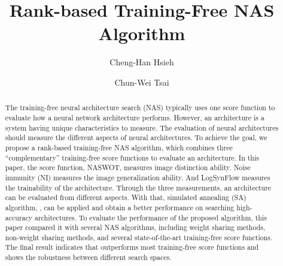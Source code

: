 \documentclass[sigconf]{acmart}
\begin{document}
\title{Rank-based Training-Free NAS Algorithm}

\author{Cheng-Han Hsieh}

\author{Chun-Wei Tsai}

\begin{abstract}
    The training-free neural architecture search (NAS) typically uses one  
    score function to evaluate how a neural network architecture performs. 
    However, an architecture is a system having unique characteristics to measure. %
	The evaluation of neural architectures should measure the different aspects of 
	neural architectures. 
    To achieve the goal, we propose a rank-based training-free NAS algorithm, 
    which combines three ``complementary'' training-free score functions to 
	evaluate an architecture. %
	In this paper, the score function, NASWOT, measures image distinction ability. 
	Noise immunity (NI) measures the image generalization ability. 
	And LogSynFlow measures the trainability of the architecture. 
    Through the three measurements, an architecture can be evaluated from different aspects. 
    With that, simulated annealing (SA) algorithm, \palg{}, 
    can be applied and obtain a better performance on searching high-accuracy architectures.  
    To evaluate the performance of the proposed algorithm, this paper compared 
    it with several NAS algorithms, including weight sharing methods, 
    non-weight sharing methods, and several state-of-the-art training-free 
    score functions. The final result indicates that \palg{} outperforms most 
    training-free score functions and shows the robustness between different 
    search spaces. 

\end{abstract}
\maketitle
\end{document}
